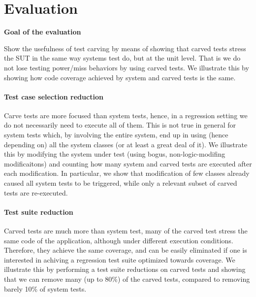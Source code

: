 \documentclass[10pt,conference]{IEEEtran}
\begin{document}




\section{Evaluation}

\textbf{Goal of the evaluation} 

Show the usefulness of test carving by means of showing that 
carved tests stress the SUT in the same way systems test do, but at the unit level. 
That is we do not lose testing power/miss behaviors by using carved tests.
%
We illustrate this by showing how code coverage achieved by system and carved tests is the same.

\paragraph{Test case selection reduction}
Carve tests are more focused than system tests, hence, in a regression setting we do not necessarily need 
to execute all of them. This is not true in general for system tests which, by involving the entire system, end up in using (hence depending on)
all the system classes (or at least a great deal of it).
%
We illustrate this by modifying the system under test (using bogus, non-logic-modifing modificaitons) and counting how many system and carved
tests are executed after each modification. In particular, we show that modification of few classes already caused all system tests to be triggered,
while only a relevant subset of carved tests are re-executed.

\paragraph{Test suite reduction}
Carved tests are much more than system test, many of the carved test stress the same code of the application, although under different execution conditions. Therefore, they achieve the same coverage, and can be easily eliminated if one is interested in achiving a regression test suite optimized towards coverage.
%
We illustrate this by performing a test suite reductions on carved tests and showing that we can remove many (up to 80\%) of the carved tests, compared to removing barely 10\% of system tests.
\end{document}
